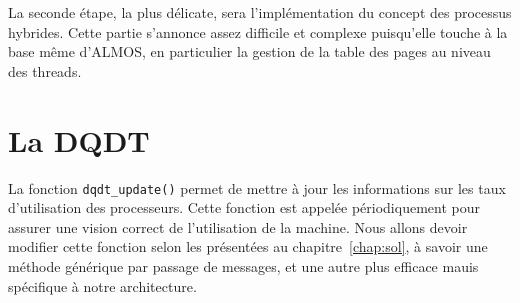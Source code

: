     La seconde étape, la plus délicate, sera l'implémentation du concept des
    processus hybrides. Cette partie s'annonce assez difficile et complexe
    puisqu'elle touche à la base même d'ALMOS, en particulier la gestion de la
    table des pages au niveau des threads.


  \section{La DQDT}  

    La fonction \texttt{dqdt\_update()} permet de mettre à jour les informations
    sur les taux d'utilisation des processeurs. Cette fonction est appelée
    périodiquement pour assurer une vision correct de l'utilisation de la
    machine. Nous allons devoir modifier cette fonction selon les présentées au
    chapitre~\ref{chap:sol}, à savoir une méthode générique par passage de
    messages, et une autre plus efficace mauis spécifique à notre architecture.
